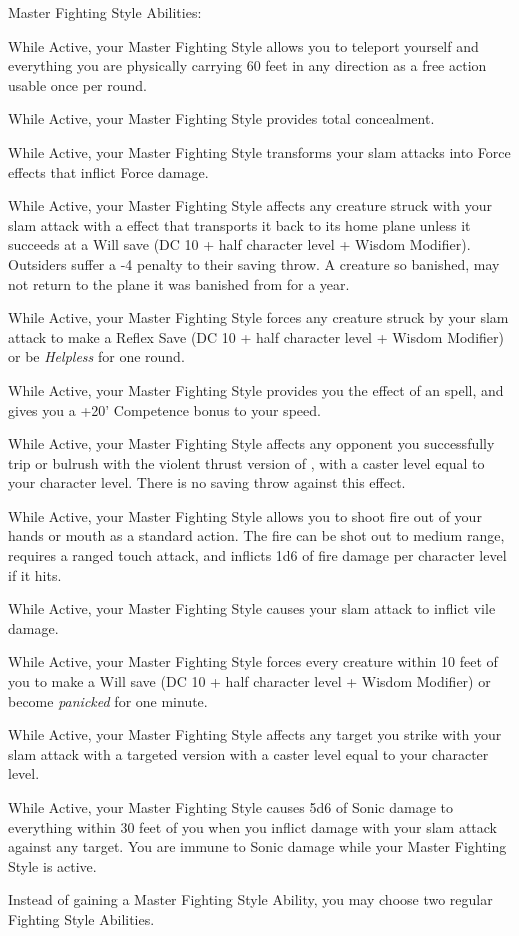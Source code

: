 Master Fighting Style Abilities:
\begin{itemize*}
\item While Active, your Master Fighting Style allows you to teleport yourself and everything you are physically carrying 60 feet in any direction as a free action usable once per round.
\item While Active, your Master Fighting Style provides total concealment. 
\item While Active, your Master Fighting Style transforms your slam attacks into Force effects that inflict Force damage.
\item While Active, your Master Fighting Style affects any creature struck with your slam attack with a  effect that transports it back to its home plane unless it succeeds at a Will save (DC 10 + half character level + Wisdom Modifier). Outsiders suffer a -4 penalty to their saving throw. A creature so banished, may not return to the plane it was banished from for a year.
\item While Active, your Master Fighting Style forces any creature struck by your slam attack to make a Reflex Save (DC 10 + half character level + Wisdom Modifier) or be \textit{Helpless} for one round.
\item While Active, your Master Fighting Style provides you the effect of an  spell, and gives you a +20' Competence bonus to your speed.
\item While Active, your Master Fighting Style affects any opponent you successfully trip or bulrush with the violent thrust version of , with a caster level equal to your character level. There is no saving throw against this effect.
\item While Active, your Master Fighting Style allows you to shoot fire out of your hands or mouth as a standard action. The fire can be shot out to medium range, requires a ranged touch attack, and inflicts 1d6 of fire damage per character level if it hits.
\item While Active, your Master Fighting Style causes your slam attack to inflict vile damage.
\item While Active, your Master Fighting Style forces every creature within 10 feet of you to make a Will save (DC 10 + half character level + Wisdom Modifier) or become \textit{panicked} for one minute.
\item While Active, your Master Fighting Style affects any target you strike with your slam attack with a targeted version  with a caster level equal to your character level. 
\item While Active, your Master Fighting Style causes 5d6 of Sonic damage to everything within 30 feet of you when you inflict damage with your slam attack against any target. You are immune to Sonic damage while your Master Fighting Style is active.
\item Instead of gaining a Master Fighting Style Ability, you may choose two regular Fighting Style Abilities.
\end{itemize*}


